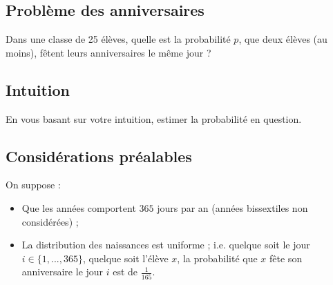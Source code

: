 


\subsection{Problème des anniversaires}
Dans une classe de 25 élèves, 
quelle est la probabilité $p$, que deux élèves (au moins), 
fêtent leurs anniversaires le même jour ? 


\subsection{Intuition}
En vous basant sur votre intuition, estimer la probabilité en question.


\subsection{Considérations préalables}
On suppose :
\begin{itemize}
	\item  Que les années comportent $365$ jours par an 
	(années bissextiles non considérées) ; 
	\item La distribution des naissances est uniforme ; 
	i.e. quelque soit le jour $i\in \{1, ..., 365\}$, 
	quelque soit l'élève $x$, 
	la probabilité que $x$ fête son anniversaire le jour $i$
	est de $\frac{1}{165}$.
\end{itemize}


